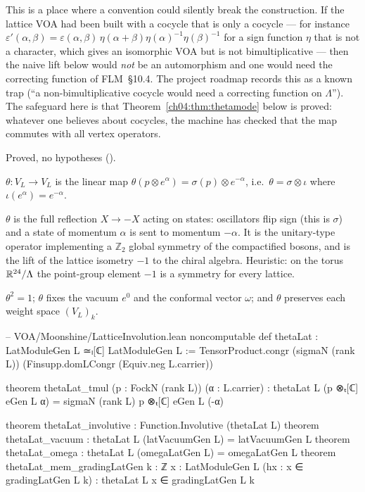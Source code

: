 \begin{warning}
This is a place where a convention could silently break the construction. If the lattice VOA had
been built with a cocycle that is only a cocycle --- for instance
$\varepsilon'(\alpha,\beta)=\varepsilon(\alpha,\beta)\,\eta(\alpha+\beta)\eta(\alpha)^{-1}\eta(\beta)^{-1}$
for a sign function $\eta$ that is not a character, which gives an isomorphic VOA but is not
bimultiplicative --- then the naive lift below would \emph{not} be an automorphism and one would
need the correcting function of FLM~\S10.4. The project roadmap records this as a known trap
(``a non-bimultiplicative cocycle would need a correcting function on $\Lambda$''). The safeguard
here is that Theorem~\ref{ch04:thm:thetamode} below is proved: whatever one believes about
cocycles, the machine has checked that the map commutes with all vertex operators.
\end{warning}

\begin{status}
Proved, no hypotheses ().
\end{status}

\begin{definition}\label{ch04:def:theta}
$\theta:V_L\to V_L$ is the linear map $\theta(p\otimes e^\alpha)=\sigma(p)\otimes e^{-\alpha}$,
i.e.\ $\theta=\sigma\otimes\iota$ where $\iota(e^\alpha)=e^{-\alpha}$.
\end{definition}

\begin{physics}
$\theta$ is the full reflection $X\to-X$ acting on states: oscillators flip sign (this is $\sigma$) and a state of momentum $\alpha$ is sent to momentum $-\alpha$. It is the unitary-type operator implementing a $\mathbb Z_2$ global symmetry of the compactified bosons, and is the lift of the lattice isometry $-1$ to the chiral algebra. Heuristic: on the torus $\mathbb R^{24}/{\Lambda}$ the point-group element $-1$ is a symmetry for every lattice.
\end{physics}

\begin{proposition}\label{ch04:prop:thetabasic}
$\theta^2=1$; $\theta$ fixes the vacuum $e^0$ and the conformal vector $\omega$; and $\theta$
preserves each weight space $(V_L)_k$.
\end{proposition}

\begin{leancode}
-- VOA/Moonshine/LatticeInvolution.lean
noncomputable def thetaLat : LatModuleGen L ≃ₗ[ℂ] LatModuleGen L :=
  TensorProduct.congr (sigmaN (rank L)) (Finsupp.domLCongr (Equiv.neg L.carrier))

theorem thetaLat_tmul (p : FockN (rank L)) (α : L.carrier) :
    thetaLat L (p ⊗ₜ[ℂ] eGen L α) = sigmaN (rank L) p ⊗ₜ[ℂ] eGen L (-α)

theorem thetaLat_involutive : Function.Involutive (thetaLat L)
theorem thetaLat_vacuum : thetaLat L (latVacuumGen L) = latVacuumGen L
theorem thetaLat_omega : thetaLat L (omegaLatGen L) = omegaLatGen L
theorem thetaLat_mem_gradingLatGen {k : ℤ} {x : LatModuleGen L} (hx : x ∈ gradingLatGen L k) :
    thetaLat L x ∈ gradingLatGen L k
\end{leancode}

